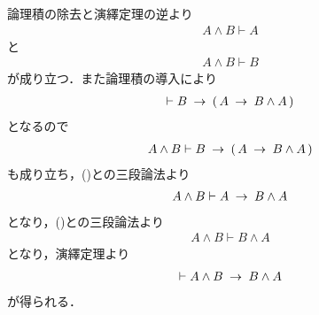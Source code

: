 	\begin{prf}
		論理積の除去と演繹定理の逆より
		\begin{align}
			A \wedge B \vdash A
			\label{fom:logicalthm_commutative_law_of_conjunction_1}
		\end{align}
		と
		\begin{align}
			A \wedge B \vdash B
			\label{fom:logicalthm_commutative_law_of_conjunction_2}
		\end{align}
		が成り立つ．また論理積の導入により
		\begin{align}
			\vdash B \hspace{0.25em}\rightarrow\hspace{0.25em} (\, A \hspace{0.25em}\rightarrow\hspace{0.25em} B \wedge A\, )
		\end{align}
		となるので
		\begin{align}
			A \wedge B \vdash B \hspace{0.25em}\rightarrow\hspace{0.25em} (\, A \hspace{0.25em}\rightarrow\hspace{0.25em} B \wedge A\, )
		\end{align}
		も成り立ち，()との三段論法より
		\begin{align}
			A \wedge B \vdash A \hspace{0.25em}\rightarrow\hspace{0.25em} B \wedge A
		\end{align}
		となり，()との三段論法より
		\begin{align}
			A \wedge B \vdash B \wedge A
		\end{align}
		となり，演繹定理より
		\begin{align}
			\vdash A \wedge B \hspace{0.25em}\rightarrow\hspace{0.25em} B \wedge A
		\end{align}
		が得られる．
		\QED
	\end{prf}